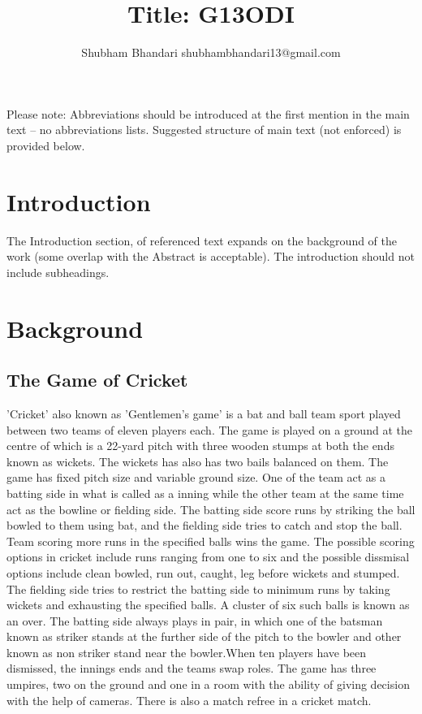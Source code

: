 \documentclass[fleqn,10pt]{wlscirep}
\title{Title: G13ODI}
\author{Shubham Bhandari shubhambhandari13@gmail.com}
\affil[]{This is project report for the subject 'CS1305: Business Intelligence' at JK Lakshmipat University, Jaipur}
\begin{document}
\flushbottom
\maketitle
\thispagestyle{empty}

\noindent Please note: Abbreviations should be introduced at the first mention in the main text – no abbreviations lists. Suggested structure of main text (not enforced) is provided below.

\section{Introduction}

The Introduction section, of referenced text\cite{Figueredo:2009dg} expands on the background of the work (some overlap with the Abstract is acceptable). The introduction should not include subheadings.

\section{Background}
\subsection{The Game of Cricket}
'Cricket' also known as 'Gentlemen's game' is a bat and ball team sport played between two teams of eleven players each. 
The game is played on a ground at the centre of which is a 22-yard pitch with three wooden stumps at both the ends known as wickets.
The wickets has also has two bails balanced on them. The game has fixed pitch size and variable ground size. 
One of the team act as a batting side in what is called as a inning while the other team at the same time act as the bowline or fielding side.
The batting side score runs by striking the ball bowled to them using bat, and the fielding side tries to catch and stop the ball. 
Team scoring more runs in the specified balls wins the game.
The possible scoring options in cricket include runs ranging from one to six and the possible dissmisal options include clean bowled, run out, caught, leg before wickets
and stumped.
The fielding side tries to restrict the batting side to minimum runs by taking wickets and exhausting the specified balls. 
A cluster of six such balls is known as an over.
The batting side always plays in pair, in which one of the batsman known as striker stands at the further side of the pitch to the bowler and other known as non striker
stand near the bowler.When ten players have been dismissed, the innings ends and the teams swap roles. The game has three umpires, two on the ground and one in a room
with the ability of giving decision with the help of cameras. There is also a match refree in a cricket match.
\end{document}

